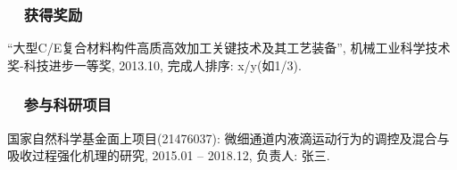 \begin{publications}
	\subsubsection*{\textbf{~~获得奖励}}
	\vspace{-10pt}
	\begin{enumerate}[label={[\arabic*]}]
		\item “大型C/E复合材料构件高质高效加工关键技术及其工艺装备”, 机械工业科学技术奖-科技进步一等奖, 2013.10, 完成人排序: x/y(如1/3).
	\end{enumerate}
	\subsubsection*{\textbf{~~参与科研项目}}
	\vspace{-10pt}
	\begin{enumerate}[label={[\arabic*]}]
		\item 国家自然科学基金面上项目(21476037): 微细通道内液滴运动行为的调控及混合与吸收过程强化机理的研究, 2015.01 – 2018.12, 负责人: 张三.
	\end{enumerate}	
\end{publications}
